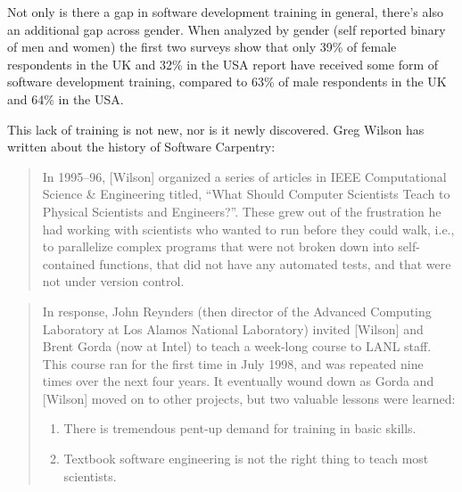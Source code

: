 \documentclass[
]{book}
\begin{document}
Not only is there a gap in software development training in general, there's also an additional
gap across gender. When analyzed by gender (self reported binary of men and women) the first
two surveys show that only 39\% of female respondents in the UK and 32\% in the USA report
have received some form of software development training, compared to 63\% of male respondents
in the UK and 64\% in the USA.

This lack of training is not new, nor is it newly discovered. Greg Wilson has written
\citep{wilsong2016, softwarecarpentryhistory} about the history of Software Carpentry:

\begin{quote}
In 1995--96, {[}Wilson{]} organized a series of articles in IEEE Computational Science \&
Engineering titled, ``What Should Computer Scientists Teach to Physical Scientists and
Engineers?''. These grew out of the frustration he had working with scientists who wanted
to run before they could walk, i.e., to parallelize complex programs that were not broken
down into self-contained functions, that did not have any automated tests, and that were
not under version control.
\end{quote}

\begin{quote}
In response, John Reynders (then director of the Advanced Computing Laboratory at
Los Alamos National Laboratory) invited {[}Wilson{]} and Brent Gorda (now at Intel) to
teach a week-long course to LANL staff. This course ran for the first time in July
1998, and was repeated nine times over the next four years. It eventually wound down
as Gorda and {[}Wilson{]} moved on to other projects, but two valuable lessons were learned:

\begin{enumerate}
\def\labelenumi{\arabic{enumi}.}
\item
  There is tremendous pent-up demand for training in basic skills.
\item
  Textbook software engineering is not the right thing to teach most scientists.
\end{enumerate}
\end{quote}
\end{document}
